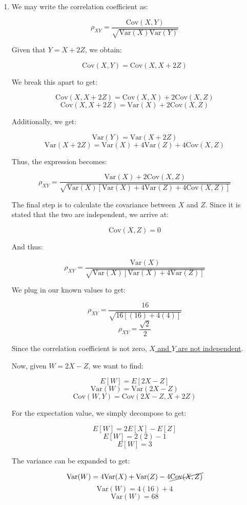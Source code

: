 \begin{enumerate}

  \item We may write the correlation coefficient as:

    $$\rho_{XY}=\frac{\text{Cov}(X,Y)}{\sqrt{\text{Var}(X)\text{Var}(Y)}}$$

    Given that $Y=X+2Z$, we obtain:

    $$\text{Cov}(X,Y)=\text{Cov}(X,X+2Z)$$

    We break this apart to get:

    $$\text{Cov}(X,X+2Z)=\text{Cov}(X,X)+2\text{Cov}(X,Z)$$
    $$\text{Cov}(X,X+2Z)=\text{Var}(X)+2\text{Cov}(X,Z)$$

    Additionally, we get:

    $$\text{Var}(Y)=\text{Var}(X+2Z)$$
    $$\text{Var}(X+2Z)=\text{Var}(X)+4\text{Var}(Z)+4\text{Cov}(X,Z)$$

    Thus, the expression becomes:

    $$\rho_{XY}=\frac{\text{Var}(X)+2\text{Cov}(X,Z)}{\sqrt{\text{Var}(X)[\text{Var}(X)+4\text{Var}(Z)+4\text{Cov}(X,Z)]}}$$

    The final step is to calculate the covariance between $X$ and $Z$. Since it is stated that the two are independent, we arrive at:

    $$\text{Cov}(X,Z)=0$$

    And thus:

    $$\rho_{XY}=\frac{\text{Var}(X)}{\sqrt{\text{Var}(X)[\text{Var}(X)+4\text{Var}(Z)]}}$$

    We plug in our known values to get:

    $$\rho_{XY}=\frac{16}{\sqrt{16[(16)+4(4)]}}$$
    $$\boxed{\rho_{XY}=\frac{\sqrt{2}}{2}}$$

    Since the correlation coefficient is not zero, \underline{$X$ and $Y$ are not independent}.

    Now, given $W=2X-Z$, we want to find:

    $$E[W]=E[2X-Z]$$
    $$\text{Var}(W)=\text{Var}(2X-Z)$$
    $$\text{Cov}(W,Y)=\text{Cov}(2X-Z,X+2Z)$$

    For the expectation value, we simply decompose to get:

    $$E[W]=2E[X]-E[Z]$$
    $$E[W]=2(2)-1$$
    $$\boxed{E[W]=3}$$

    The variance can be expanded to get:

    $$\text{Var}(W)=4\text{Var}(X)+\text{Var}(Z)-4\cancel{\text{Cov}(X,Z)}$$
    $$\text{Var}(W)=4(16)+4$$
    $$\boxed{\text{Var}(W)=68}$$


\end{enumerate}
